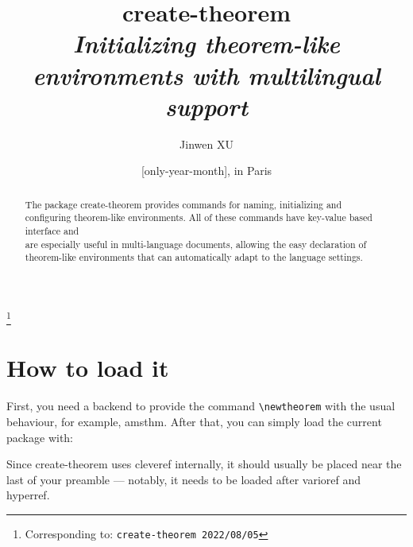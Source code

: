 \documentclass[classical]{einfart}
\newcommand{\meta}[1]{$\langle${\normalfont\itshape#1}$\rangle$}
\newenvironment{tip}[1][Tip]
  {%
    \LocallyStopLineNumbers%
    \begin{tcolorbox}[breakable,
        enhanced,
        width = \textwidth,
        colback = paper, colbacktitle = paper,
        colframe = gray!50, boxrule=0.2mm,
        coltitle = black,
        fonttitle = \sffamily,
        attach boxed title to top left = {yshift=-\tcboxedtitleheight/2, xshift=.5cm},
        boxed title style = {boxrule=0pt, colframe=paper},
        before skip = 3mm,
        after skip = 3mm,
        top = 2.5mm,
        bottom = 1.5mm,
        title={\scshape\sffamily #1}]%
  }
  {%
    \end{tcolorbox}%
    \ResumeLineNumbers%
  }
\newcommand{\createtheorempackage}{\textsf{create-theorem}}
\begin{document}
\def\PackageVersion{2022/08/05}

\title{\createtheorempackage{}\\\smallskip\itshape Initializing theorem-like environments with multilingual support}
\author{Jinwen XU}
\thanks{Corresponding to: \texttt{\createtheorempackage{} \PackageVersion}}
\date{\TheDate{\PackageVersion}[only-year-month], in Paris}

\maketitle

\begin{abstract}
    \raggedleft
    The package \createtheorempackage{} provides commands for naming, initializing and configuring theorem-like environments. All of these commands have key-value based interface and \\are especially useful in multi-language documents, allowing the easy declaration of \\theorem-like environments that can automatically adapt to the language settings.
\end{abstract}

\vspace{-.5\baselineskip}



\section{How to load it}

First, you need a backend to provide the command \lstinline|\newtheorem| with the usual behaviour, for example, \textsf{amsthm}. After that, you can simply load the current package with:

\begin{code}
\usepackage[(*\meta{options}*)]{create-theorem}
\end{code}

\begin{tip}
    Since \createtheorempackage{} uses \textsf{cleveref} internally, it should usually be placed near the last of your preamble --- notably, it needs to be loaded after \textsf{varioref} and \textsf{hyperref}.
\end{tip}
\end{document}
